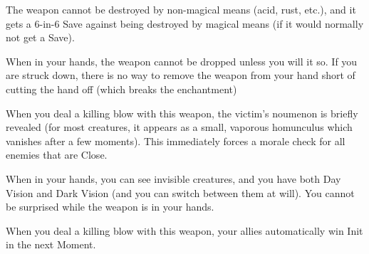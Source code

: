 {


The weapon cannot be destroyed by non-magical means (acid, rust, etc.), and it gets a 6-in-6 Save against being destroyed by magical means (if it would normally not get a Save).


When in your hands, the weapon cannot be dropped unless you will it so.  If you are struck down, there is no way to remove the weapon from your hand short of cutting the hand off (which breaks the enchantment)



When you deal a killing blow with this weapon, the victim's noumenon is briefly revealed (for most creatures, it appears as a small, vaporous homunculus which vanishes after a few moments).  This immediately forces a morale check for all enemies that are Close.



When in your hands, you can see invisible creatures, and you have both Day Vision and Dark Vision (and you can switch between them at will).  You cannot be surprised while the weapon is in your hands.



When you deal a killing blow with this weapon, your allies automatically win Init in the next Moment.




}%

